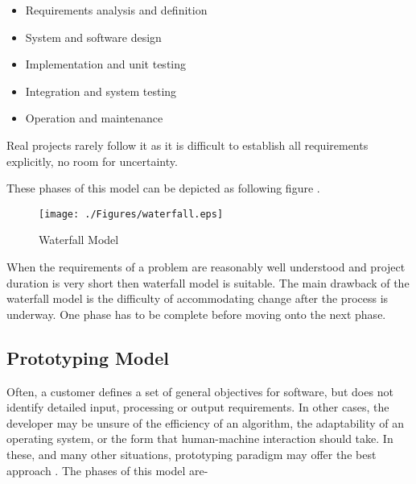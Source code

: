 \begin{itemize}
    \item {Requirements analysis and definition}
    \item {System and software design}
    \item {Implementation and unit testing}
    \item {Integration and system testing }
    \item {Operation and maintenance}
\end{itemize}

Real projects rarely follow it as it is difficult to establish all
requirements explicitly, no room for uncertainty.

These phases of this model can be depicted as following figure
\citep{bandinelli1993software}.

\begin{figure}[htbp]
  \centering
\texttt{[image: ./Figures/waterfall.eps]}
  \caption[Waterfall Model]{Waterfall Model}
  \label{fig:Waterfall}
\end{figure}


When the requirements of a problem are reasonably well understood
and project duration is very short then waterfall model is
suitable. The main drawback of the waterfall model is the
difficulty of accommodating change after the process is underway.
One phase has to be complete before moving onto the next phase.
\subsection{Prototyping Model}
Often, a customer defines a set of general objectives for
software, but does not identify detailed input, processing or
output requirements. In other cases, the developer may be unsure
of the efficiency of an algorithm, the adaptability of an
operating system, or the form that human-machine interaction
should take. In these, and many other situations, prototyping
paradigm may offer the best approach \citep{pressman2005software}.
The phases \citep{bandinelli1993software} of this model are-


